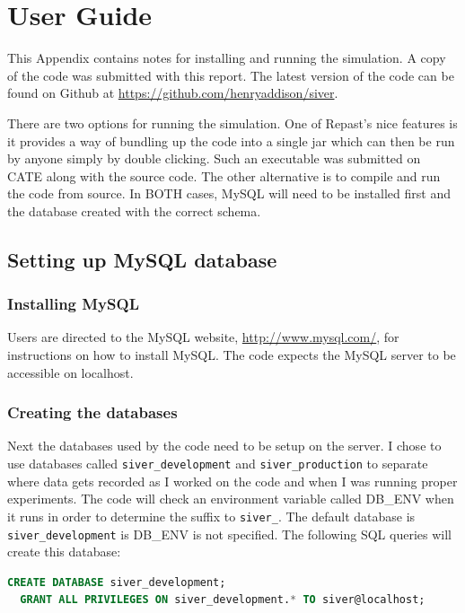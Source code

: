 \chapter{User Guide}\label{appendix:user_guide}
This Appendix contains notes for installing and running the simulation. A copy of the code was submitted with this report. The latest version of the code can be found on Github at \url{https://github.com/henryaddison/siver}.

There are two options for running the simulation. One of Repast's nice features is it provides a way of bundling up the code into a single jar which can then be run by anyone simply by double clicking. Such an executable was submitted on CATE along with the source code. The other alternative is to compile and run the code from source. In BOTH cases, MySQL will need to be installed first and the database created with the correct schema.

\section{Setting up MySQL database}

\subsection*{Installing MySQL}

Users are directed to the MySQL website, \url{http://www.mysql.com/}, for instructions on how to install MySQL. The code expects the MySQL server to be accessible on localhost.

\subsection*{Creating the databases}

Next the databases used by the code need to be setup on the server. I chose to use databases called \texttt{siver\_development} and \texttt{siver\_production} to separate where data gets recorded as I worked on the code and when I was running proper experiments. The code will check an environment variable called DB\_ENV when it runs in order to determine the suffix to \texttt{siver\_}. The default database is \texttt{siver\_development} is DB\_ENV is not specified. The following SQL queries will create this database:

\begin{lstlisting}[language=SQL]
  CREATE DATABASE siver_development;
  GRANT ALL PRIVILEGES ON siver_development.* TO siver@localhost;
\end{lstlisting}

